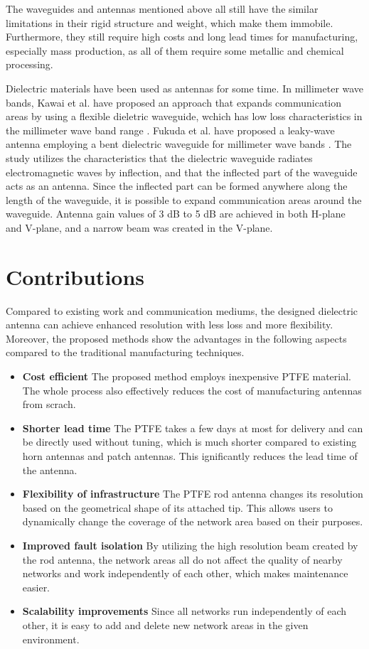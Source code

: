 \documentclass[a4paper,12pt]{report}
\begin{document}
The waveguides and antennas mentioned above
all still have the similar limitations in their
rigid structure and weight,
which make them immobile.
Furthermore, they still require high costs
and long lead times for manufacturing,
especially mass production,
as all of them require some metallic and chemical processing.

Dielectric materials have been used as antennas for some time.
In millimeter wave bands, Kawai et al. have proposed an approach that expands
communication areas by using a flexible dieletric waveguide,
wchich has low loss characteristics in the millimeter wave band range \cite{new_area_formation_approach}.
Fukuda et al. have proposed a leaky-wave antenna employing a bent dielectric waveguide for
millimeter wave bands \cite{leaky_wave_antenna_bent_dielectric}.
The study utilizes the characteristics that the
dielectric waveguide radiates electromagnetic waves by
inflection, and that the inflected part of the waveguide acts as
an antenna.
Since the inflected part can be formed anywhere along the length of
the waveguide, it is possible to expand communication areas
around the waveguide. 
Antenna gain values of 3 dB to 5 dB are
achieved in both H-plane and V-plane,
and a narrow beam was created in the V-plane.

\section{Contributions}

Compared to existing work and communication mediums,
the designed dielectric antenna can achieve
enhanced resolution with less loss and more flexibility.
Moreover, the proposed methods
show the advantages in the following aspects compared to the traditional
manufacturing techniques.

\begin{itemize}
  \item[] \textbf{Cost efficient}
  The proposed method employs inexpensive PTFE material.
  The whole process also effectively reduces the cost of
  manufacturing antennas from scrach.
  \item[] \textbf{Shorter lead time}
  The PTFE takes a few days at most for delivery and can be directly used without tuning,
  which is much shorter compared to existing horn antennas and patch antennas.
  This ignificantly reduces the lead time of the antenna.
  \item[] \textbf{Flexibility of infrastructure}
  The PTFE rod antenna changes its resolution based
  on the geometrical shape of its attached tip.
  This allows users to dynamically change
  the coverage of the network area based on their purposes.
  \item[] \textbf{Improved fault isolation}
  By utilizing the high resolution beam created by the rod antenna,
  the network areas all do not affect the quality of nearby networks and
  work independently of each other,
  which makes maintenance easier.
  \item[] \textbf{Scalability improvements}
  Since all networks run independently of each other,
  it is easy to add and delete new network areas in the given environment.
\end{itemize}
\end{document}
